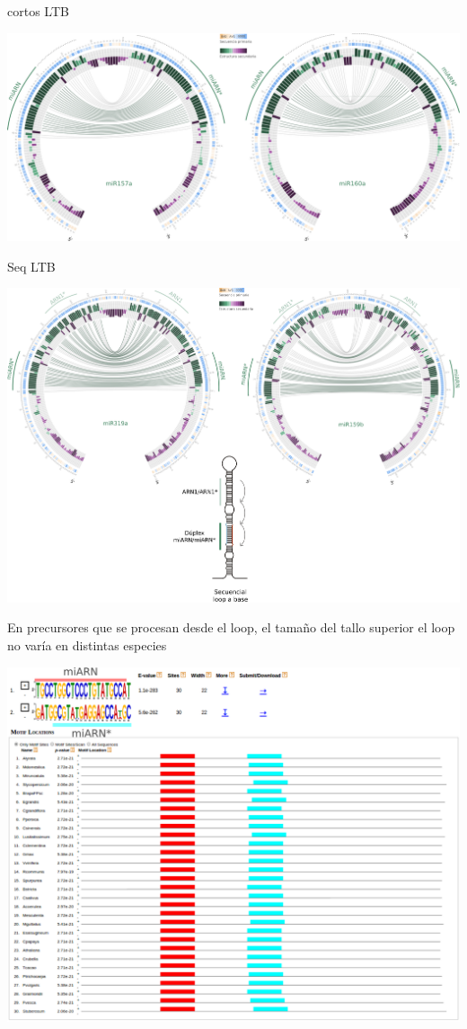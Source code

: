 \documentclass{beamer}
\begin{document}
\begin{frame}{cortos LTB}
	\begin{center}
		\includegraphics[width=1\textwidth]{img/srLTB_circos.png}
	\end{center}
\end{frame}

\begin{frame}{Seq LTB}
	\begin{center}
		\includegraphics[width=1\textwidth]{img/seqLTB_circos.png}
	\end{center}
\end{frame}

\begin{frame}{En precursores que se procesan desde el loop, el tamaño del tallo superior el loop no varía en distintas especies}
	\begin{center}
		\includegraphics[width=.8\textwidth]{img/miR160a_meme.png}
	\end{center}
\end{frame}
\end{document}
